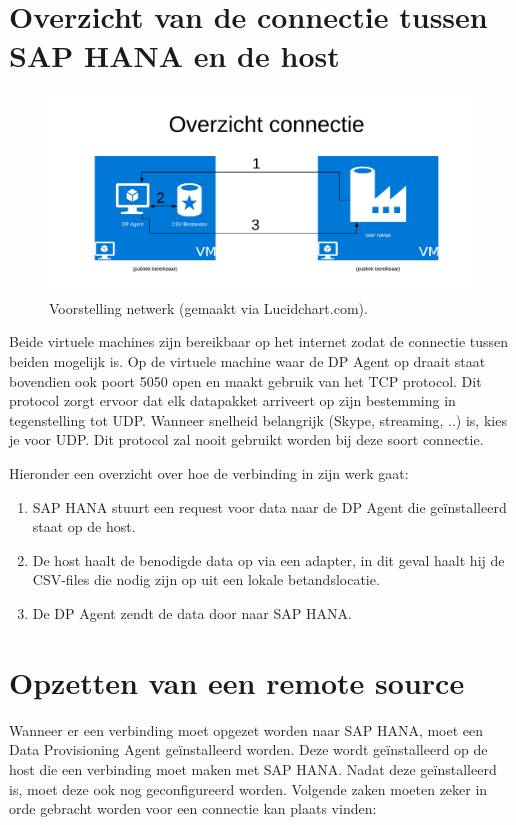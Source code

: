 \section{Overzicht van de connectie tussen SAP HANA en de host}
\begin{figure}[h]
	\centering
	\includegraphics[scale=0.5]{../images/AzureConnectieBP.png}
	\caption{Voorstelling netwerk (gemaakt via Lucidchart.com).}
	\label{fig:azureconn}
\end{figure}

Beide virtuele machines zijn bereikbaar op het internet zodat de connectie tussen beiden mogelijk is. Op de virtuele machine waar de DP Agent op draait staat bovendien ook poort 5050 open en maakt gebruik van het TCP protocol. Dit protocol zorgt ervoor dat elk datapakket arriveert op zijn bestemming in tegenstelling tot UDP. Wanneer snelheid belangrijk (Skype, streaming, ..) is, kies je voor UDP. Dit protocol zal nooit gebruikt worden bij deze soort connectie.

Hieronder een overzicht over hoe de verbinding in zijn werk gaat:

\begin{enumerate}
	\item SAP HANA stuurt een request voor data naar de DP Agent die geïnstalleerd staat op de host.
	\item De host haalt de benodigde data op via een adapter, in dit geval haalt hij de CSV-files die nodig zijn op uit een lokale betandslocatie.
	\item De DP Agent zendt de data door naar SAP HANA.
\end{enumerate}

\section{Opzetten van een remote source}
Wanneer er een verbinding moet opgezet worden naar SAP HANA, moet een Data Provisioning Agent geïnstalleerd worden. Deze wordt geïnstalleerd op de host die een verbinding moet maken met SAP HANA. Nadat deze geïnstalleerd is, moet deze ook nog geconfigureerd worden. Volgende zaken moeten zeker in orde gebracht worden voor een connectie kan plaats vinden: 

